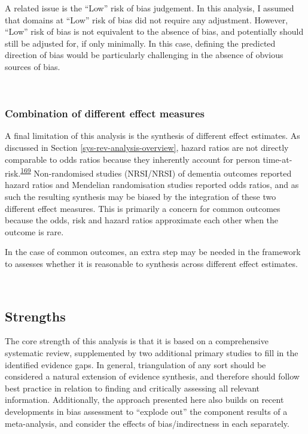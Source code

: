 \documentclass[a4paper, twoside]{templates/ociamthesis}
\begin{document}
A related issue is the ``Low'' risk of bias judgement. In this analysis, I assumed that domains at ``Low'' risk of bias did not require any adjustment. However, ``Low'' risk of bias is not equivalent to the absence of bias, and potentially should still be adjusted for, if only minimally. In this case, defining the predicted direction of bias would be particularly challenging in the absence of obvious sources of bias.

~

\hypertarget{combination-of-different-effect-measures}{%
\subsubsection{Combination of different effect measures}\label{combination-of-different-effect-measures}}

A final limitation of this analysis is the synthesis of different effect estimates. As discussed in Section \ref{sys-rev-analysis-overview}, hazard ratios are not directly comparable to odds ratios because they inherently account for person time-at-risk.\textsuperscript{\protect\hyperlink{ref-mckenzie2019}{169}} Non-randomised studies (NRSI/NRSI) of dementia outcomes reported hazard ratios and Mendelian randomisation studies reported odds ratios, and as such the resulting synthesis may be biased by the integration of these two different effect measures. This is primarily a concern for common outcomes because the odds, risk and hazard ratios approximate each other when the outcome is rare.

In the case of common outcomes, an extra step may be needed in the framework to assesses whether it is reasonable to synthesis across different effect estimates.

~

\hypertarget{strengths-2}{%
\subsection{Strengths}\label{strengths-2}}

The core strength of this analysis is that it is based on a comprehensive systematic review, supplemented by two additional primary studies to fill in the identified evidence gaps. In general, triangulation of any sort should be considered a natural extension of evidence synthesis, and therefore should follow best practice in relation to finding and critically assessing all relevant information. Additionally, the approach presented here also builds on recent developments in bias assessment to ``explode out'' the component results of a meta-analysis, and consider the effects of bias/indirectness in each separately.
\end{document}
